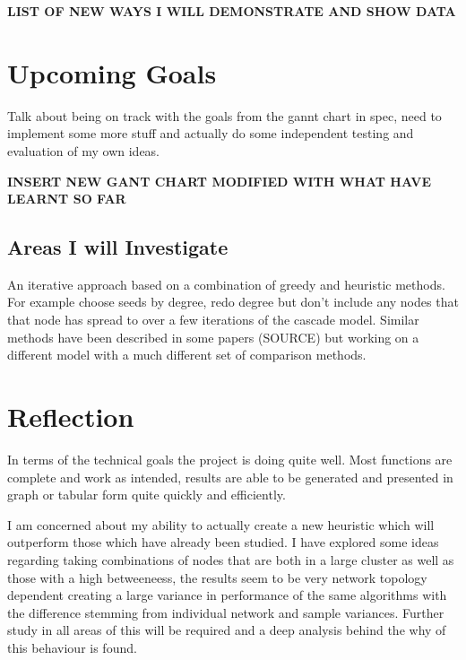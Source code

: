 \documentclass{article}
\begin{document}
\textbf{LIST OF NEW WAYS I WILL DEMONSTRATE AND SHOW DATA }

\section{Upcoming Goals}

Talk about being on track with the goals from the gannt chart in spec, need to implement some more stuff and actually do some independent testing and evaluation of my own ideas.

\textbf{INSERT NEW GANT CHART MODIFIED WITH WHAT HAVE LEARNT SO FAR}

\subsection{Areas I will Investigate}

An iterative approach based on a combination of greedy and heuristic methods.
For example choose seeds by degree, redo degree but don't include any nodes that that node has spread to over a few iterations of the cascade model.
Similar methods have been described in some papers (SOURCE) but working on a different model with a much different set of comparison methods.




\section{Reflection}
In terms of the technical goals the project is doing quite well.
Most functions are complete and work as intended, results are able to be generated and presented in graph or tabular form quite quickly and efficiently.

I am concerned about my ability to actually create a new heuristic which will outperform those which have already been studied.
I have explored some ideas regarding taking combinations of nodes that are both in a large cluster as well as those with a high betweeneess, the results seem to be very network topology dependent creating a large variance in performance of the same algorithms with the difference stemming from individual network and sample variances.
Further study in all areas of this will be required and a deep analysis behind the why of this behaviour is found.
\\
\end{document}
